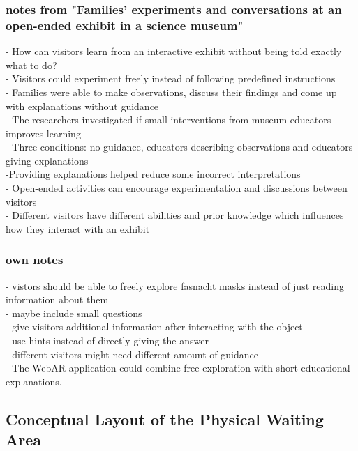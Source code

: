 \documentclass{article}
\begin{document}
\subsubsection{notes from "Families' experiments and conversations at an open-ended exhibit in a science museum"}
- How can visitors learn from an interactive exhibit without being told exactly what to do?
\\
- Visitors could experiment freely instead of following predefined instructions
\\
- Families were able to make observations, discuss their findings and come up with explanations without guidance
\\
- The researchers investigated if small interventions from museum educators improves learning
\\
- Three conditions: no guidance, educators describing observations and educators giving explanations
\\
-Providing explanations helped reduce some incorrect interpretations
\\
- Open-ended activities can encourage experimentation and discussions between visitors
\\
- Different visitors have different abilities and prior knowledge which influences how they interact with an exhibit
\\
\subsubsection{own notes}
- vistors should be able to freely explore fasnacht masks instead of just reading information about them
\\
- maybe include small questions
\\
- give visitors additional information after interacting with the object
\\
- use hints instead of directly giving the answer
\\
- different visitors might need different amount of guidance
\\
- The WebAR application could combine free exploration with short educational explanations.
\newpage
\subsection{Conceptual Layout of the Physical Waiting Area}
\end{document}
